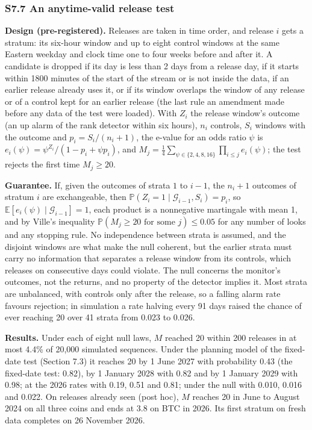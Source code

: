 \documentclass[
]{article}
\begin{document}
\hypertarget{s7.7-an-anytime-valid-release-test}{%
\subsubsection{S7.7 An anytime-valid release
test}\label{s7.7-an-anytime-valid-release-test}}

\textbf{Design (pre-registered).} Releases are taken in time order, and
release \(i\) gets a stratum: its six-hour window and up to eight
control windows at the same Eastern weekday and clock time one to four
weeks before and after it. A candidate is dropped if its day is less
than 2 days from a release day, if it starts within 1800 minutes of the
start of the stream or is not inside the data, if an earlier release
already uses it, or if its window overlaps the window of any release or
of a control kept for an earlier release (the last rule an amendment
made before any data of the test were loaded). With \(Z_i\) the release
window's outcome (an up alarm of the rank detector within six hours),
\(n_i\) controls, \(S_i\) windows with the outcome and
\(p_i = S_i/(n_i+1)\), the e-value for an odds ratio \(\psi\) is
\(e_i(\psi) = \psi^{Z_i}/(1 - p_i + \psi p_i)\), and
\(M_j = \tfrac14 \sum_{\psi \in \{2, 4, 8, 16\}} \prod_{i \le j} e_i(\psi)\);
the test rejects the first time \(M_j \ge 20\).

\textbf{Guarantee.} If, given the outcomes of strata \(1\) to \(i - 1\),
the \(n_i + 1\) outcomes of stratum \(i\) are exchangeable, then
\(\mathbb{P}(Z_i = 1 \mid \mathcal{G}_{i-1}, S_i) = p_i\), so
\(\mathbb{E}[e_i(\psi) \mid \mathcal{G}_{i-1}] = 1\), each product is a
nonnegative martingale with mean 1, and by Ville's inequality
\(\mathbb{P}(M_j \ge 20 \text{ for some } j) \le 0.05\) for any number
of looks and any stopping rule. No independence between strata is
assumed, and the disjoint windows are what make the null coherent, but
the earlier strata must carry no information that separates a release
window from its controls, which releases on consecutive days could
violate. The null concerns the monitor's outcomes, not the returns, and
no property of the detector implies it. Most strata are unbalanced, with
controls only after the release, so a falling alarm rate favours
rejection; in simulation a rate halving every 91 days raised the chance
of ever reaching 20 over 41 strata from 0.023 to 0.026.

\textbf{Results.} Under each of eight null laws, \(M\) reached 20 within
200 releases in at most 4.4\% of 20,000 simulated sequences. Under the
planning model of the fixed-date test (Section 7.3) it reaches 20 by 1
June 2027 with probability 0.43 (the fixed-date test: 0.82), by 1
January 2028 with 0.82 and by 1 January 2029 with 0.98; at the 2026
rates with 0.19, 0.51 and 0.81; under the null with 0.010, 0.016 and
0.022. On releases already seen (post hoc), \(M\) reaches 20 in June to
August 2024 on all three coins and ends at 3.8 on BTC in 2026. Its first
stratum on fresh data completes on 26 November 2026.
\end{document}
